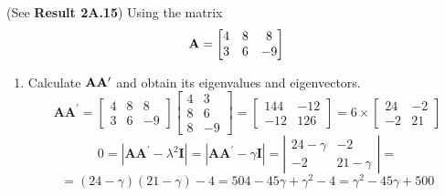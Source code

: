         (See \textbf{Result 2A.15}) Using the matrix
        \[
            \bold{A}
            =
            \begin{bmatrix}
                4 & 8 & 8 \\
                3 & 6 & -9
            \end{bmatrix}
        \]
        \begin{enumerate}[label=(\alph*)]
            \item Calculate $\bold{A}\bold{A}^\prime$ and obtain its eigenvalues and eigenvectors.
            \[
                \mathbf{A}\mathbf{A}^\prime
                =
                \begin{bmatrix}
                    4 & 8 & 8\\
                    3 & 6 & -9
                \end{bmatrix}
                \begin{bmatrix}
                    4 & 3 \\
                    8 & 6 \\
                    8 & -9
                \end{bmatrix}
                =
                \begin{bmatrix}
                    144 & -12 \\
                    -12 & 126
                \end{bmatrix}
                =
                6 \times
                \begin{bmatrix}
                    24 & -2 \\
                    -2 & 21
                \end{bmatrix}
            \]
            \[
                0 = \left|\mathbf{A}\mathbf{A}^\prime - \lambda^2\mathbf{I}\right| = \left|\mathbf{A}\mathbf{A}^\prime - \gamma\mathbf{I}\right|
                =
                \left|
                \begin{matrix}
                    24 - \gamma & -2 \\
                    -2 & 21 - \gamma
                \end{matrix}
                \right|
                =
            \]
            \[
                =
                (24-\gamma)(21-\gamma) - 4
                =
                504-45\gamma+\gamma^2-4
                =
                \gamma^2 - 45\gamma +500
\]
\end{enumerate}
